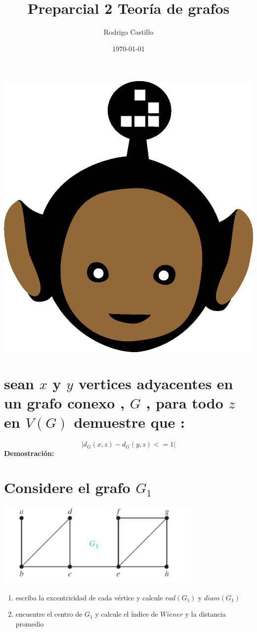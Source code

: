 \documentclass[10pt,a4paper]{article} %
\begin{document}
    \title{{  Preparcial 2 Teoría de grafos  }}
    \author{{Rodrigo Castillo}}
    \date{\today}

    \maketitle


    \includegraphics[width=0.1\linewidth]{negro_cara.png}
    \section{sean $x$ y $y$ vertices adyacentes en un grafo conexo , $G$ , para
    todo $z$ en $V(G)$  demuestre que :}
    \begin{equation}
        |d_G (x,z) - d_G (y,z) <=1 |
    \end{equation}
    \textbf{Demostración:}




    \section{Considere el grafo $G_1$ }
        \begin{center}
        \includegraphics[width=0.4\linewidth]{grafop2.png}
        \end{center}
        \begin{center}
        \begin{enumerate}
            \item {escriba la excentricidad de cada vértice y calcule $rad(G_1)$ y $diam(G_1)$}
            \item {encuentre el centro de $G_1$ y calcule el índice de $Wiener$
                y la distancia promedio}
        \end{enumerate}
        \end{center}
\end{document}

